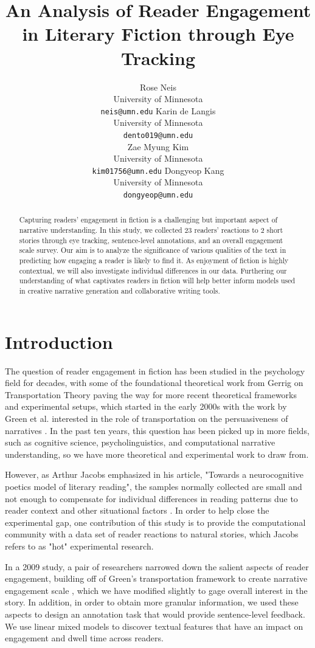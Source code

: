 \documentclass[11pt]{article}
\title{An Analysis of Reader Engagement in Literary Fiction through Eye Tracking}
\author{Rose Neis \\
  University of Minnesota  \\
  \texttt{neis@umn.edu}
  \And
  Karin de Langis \\
  University of Minnesota\\
  \texttt{dento019@umn.edu} \\
  \AND
  Zae Myung Kim \\
  University of Minnesota\\
  \texttt{kim01756@umn.edu}
  \And
  Dongyeop Kang \\
  University of Minnesota\\
  \texttt{dongyeop@umn.edu} \\
  }
\begin{document}
\maketitle

\begin{abstract}
Capturing readers' engagement in fiction is a challenging but important aspect of narrative understanding. In this study, we collected 23 readers’ reactions to 2 short stories through eye tracking, sentence-level annotations, and an overall engagement scale survey. Our aim is to analyze the significance of various qualities of the text in predicting how engaging a reader is likely to find it. As enjoyment of fiction is highly contextual, we will also investigate individual differences in our data. Furthering our understanding of what captivates readers in fiction will help better inform models used in creative narrative generation and collaborative writing tools.
\end{abstract}
\section{Introduction}
The question of reader engagement in fiction has been studied in the psychology field for decades, with some of the foundational theoretical work from Gerrig on Transportation Theory \citep{gerrig_1993} paving the way for more recent theoretical frameworks and experimental setups, which started in the early 2000s with the work by Green et al. interested in the role of transportation on the persuasiveness of narratives \citep{Green2004,green_brock_kaufman_2006}. In the past ten years, this question has been picked up in more fields, such as cognitive science, psycholinguistics, and computational narrative understanding, so we have more theoretical and experimental work to draw from.

However, as Arthur Jacobs emphasized in his article, "Towards a neurocognitive poetics model of literary reading", the samples normally collected are small and not enough to compensate for individual differences in reading patterns due to reader context and other situational factors \citep{willems_2015}. In order to help close the experimental gap, one contribution of this study is to provide the computational community with a data set of reader reactions to natural stories, which Jacobs refers to as "hot" experimental research.

In a 2009 study, a pair of researchers narrowed down the salient aspects of reader engagement, building off of Green's transportation framework to create narrative engagement scale \citep{busselle2009}, which we have modified slightly to gage overall interest in the story. In addition, in order to obtain more granular information, we used these aspects to design an annotation task that would provide sentence-level feedback. We use linear mixed models to discover textual features that have an impact on engagement and dwell time across readers.
\end{document}
